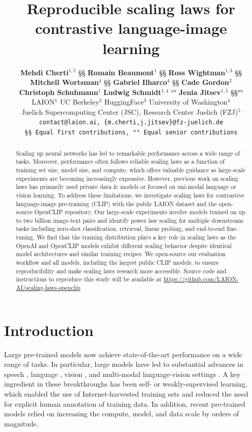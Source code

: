\documentclass[11pt,table]{article}
\title{Reproducible scaling laws for contrastive language-image learning}  %
\author{
\textbf{Mehdi Cherti}$^{1,5}$ §§ \quad \textbf{Romain Beaumont}$^1$ §§ \quad \textbf{Ross Wightman}$^{1,3}$ §§  \\ \textbf{Mitchell Wortsman}$^{4}$ §§ \quad \textbf{Gabriel Ilharco}$^{4}$ §§ \quad \textbf{Cade Gordon}$^{2}$ \\ 
\textbf{Christoph Schuhmann}$^1$ \quad  \textbf{Ludwig Schmidt}$^{1,4}$ °° \quad \textbf{Jenia Jitsev}$^{1,5}$ §§°° \\
LAION$^1$ \quad UC Berkeley$^2$ \quad HuggingFace$^{3}$ \quad University of Washington$^4$ \\ 
Juelich Supercomputing Center (JSC), Research Center Juelich (FZJ)$^{5}$  \\ 
\texttt{contact@laion.ai, \{m.cherti,j.jitsev\}@fz-juelich.de} \\
\texttt{§§ Equal first contributions, °° Equal senior contributions}
}
\newcommand{\citep}{\cite}
\begin{document}
\date{}

\maketitle

\begin{abstract}
Scaling up neural networks has led to remarkable performance  across a wide range of tasks.
Moreover, performance often follows reliable scaling laws as a function of training set size, model size, and compute, which offers valuable guidance as large-scale experiments are becoming increasingly expensive.
However, previous work on scaling laws has primarily used private data \& models or  focused on uni-modal language or vision learning.
To address these limitations, we investigate scaling laws for contrastive language-image pre-training (CLIP) with the public LAION dataset and the open-source OpenCLIP repository.
Our large-scale experiments involve models trained on up to two billion image-text pairs and identify power law scaling for multiple downstream tasks including zero-shot classification, retrieval, linear probing, and end-to-end fine-tuning.
We find that the training distribution plays a key role in scaling laws as the OpenAI and OpenCLIP models exhibit different scaling behavior despite identical model architectures and similar training recipes.
We open-source our evaluation workflow and all models, including the largest public CLIP models, to ensure reproducibility and make scaling laws research more accessible. Source code and instructions to reproduce this study will be available at \url{https://github.com/LAION-AI/scaling-laws-openclip}
\end{abstract}


\section{Introduction}
\label{sect:introduction}

Large pre-trained models now achieve state-of-the-art performance on a wide range of tasks. 
In particular, large models have led to substantial advances in speech \citep{radford2022robust}, language \citep{devlin2019bert,t5,Brown2020,hoffmann2022training}, vision \citep{Kolesnikov2020,Zhai2022scaling}, and multi-modal language-vision settings \citep{radford2021learning,ALIGN,basic,ramesh2022hierarchical,rombach2021highresolution}.
A key ingredient in these breakthroughs has been self- or weakly-supervised learning, which enabled the use of Internet-harvested training sets and reduced the need for explicit human annotation of training data.
In addition, recent pre-trained models relied on increasing the compute, model, and data scale by orders of magnitude.
\end{document}
